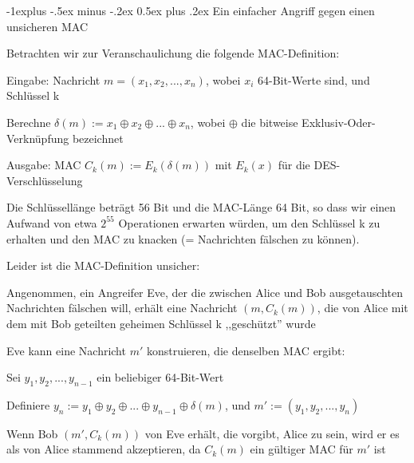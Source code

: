\documentclass[a4paper]{article}
\makeatletter
\renewcommand{\subsection}{\@startsection{subsection}{2}{0mm}%
 {-1explus -.5ex minus -.2ex}%
 {0.5ex plus .2ex}%
 {\normalfont\normalsize\bfseries}}
\makeatother
\begin{document}
\begin{multicols}{3}
      \subsection{Ein einfacher Angriff gegen einen unsicheren MAC}
      \begin{itemize*}
            \item Betrachten wir zur Veranschaulichung die folgende MAC-Definition:
            \begin{itemize*}
                  \item Eingabe: Nachricht $m=(x_1,x_2,...,x_n)$, wobei $x_i$ 64-Bit-Werte sind, und Schlüssel k
                  \item Berechne $\delta(m):= x_1\oplus x_2\oplus...\oplus x_n$, wobei $\oplus$ die bitweise Exklusiv-Oder-Verknüpfung bezeichnet
                  \item Ausgabe: MAC $C_k(m):= E_k(\delta(m))$ mit $E_k(x)$ für die DES-Verschlüsselung
            \end{itemize*}
            \item Die Schlüssellänge beträgt 56 Bit und die MAC-Länge 64 Bit, so dass wir einen Aufwand von etwa $2^{55}$ Operationen erwarten würden, um den Schlüssel k zu erhalten und den MAC zu knacken (= Nachrichten fälschen zu können).
            \item Leider ist die MAC-Definition unsicher:
            \begin{itemize*}
                  \item Angenommen, ein Angreifer Eve, der die zwischen Alice und Bob ausgetauschten Nachrichten fälschen will, erhält eine Nachricht $(m,C_k(m))$, die von Alice mit dem mit Bob geteilten geheimen Schlüssel k ,,geschützt'' wurde
                  \item Eve kann eine Nachricht $m'$ konstruieren, die denselben MAC ergibt:
                  \begin{itemize*}
                        \item Sei $y_1,y_2,...,y_{n-1}$ ein beliebiger 64-Bit-Wert
                        \item Definiere $y_n:= y_1\oplus y_2\oplus...\oplus y_{n-1}\oplus \delta(m)$, und $m':=(y_1,y_2,...,y_n)$
                        \item Wenn Bob $(m',C_k(m))$ von Eve erhält, die vorgibt, Alice zu sein, wird er es als von Alice stammend akzeptieren, da $C_k(m)$ ein gültiger MAC für $m'$ ist
                  \end{itemize*}
            \end{itemize*}
      \end{itemize*}


\end{multicols}
\end{document}
